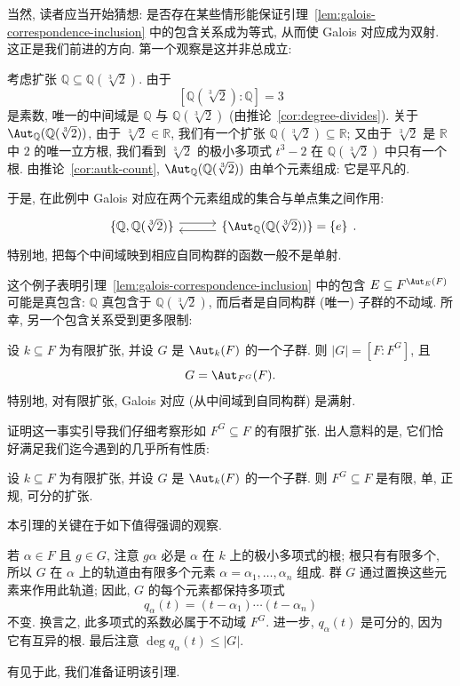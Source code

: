 当然, 读者应当开始猜想: 是否存在某些情形能保证引理~\ref{lem:galois-correspondence-inclusion} 中的包含关系成为等式, 从而使 Galois 对应成为双射. 这正是我们前进的方向. 第一个观察是这并非总成立:

\begin{example}\label{ex:cube-root-2-not-galois}
考虑扩张 $\mathbb{Q}\subseteq\mathbb{Q}(\sqrt[3]{2})$. 由于
\[
[\mathbb{Q}(\sqrt[3]{2}):\mathbb{Q}]=3
\]
是素数, 唯一的中间域是 $\mathbb{Q}$ 与 $\mathbb{Q}(\sqrt[3]{2})$ (由推论~\ref{cor:degree-divides}). 关于 $\Aut_{\mathbb{Q}}(\mathbb{Q}(\sqrt[3]{2}))$, 由于 $\sqrt[3]{2}\in\mathbb{R}$, 我们有一个扩张 $\mathbb{Q}(\sqrt[3]{2})\subseteq\mathbb{R}$; 又由于 $\sqrt[3]{2}$ 是 $\mathbb{R}$ 中 $2$ 的唯一立方根, 我们看到 $\sqrt[3]{2}$ 的极小多项式 $t^3-2$ 在 $\mathbb{Q}(\sqrt[3]{2})$ 中只有一个根. 由推论~\ref{cor:autk-count}, $\Aut_{\mathbb{Q}}(\mathbb{Q}(\sqrt[3]{2}))$ 由单个元素组成: 它是平凡的.

于是, 在此例中 Galois 对应在两个元素组成的集合与单点集之间作用:
\[
\begin{tikzcd}[column sep=3em]
\{\mathbb{Q},\mathbb{Q}(\sqrt[3]{2})\} \ar[r,shift left=.7ex] & \{\Aut_{\mathbb{Q}}(\mathbb{Q}(\sqrt[3]{2}))\}=\{e\} \ar[l,shift left=.7ex]
\end{tikzcd}.
\]
特别地, 把每个中间域映到相应自同构群的函数一般不是单射.

这个例子表明引理~\ref{lem:galois-correspondence-inclusion} 中的包含 $E\subseteq F^{\Aut_E(F)}$ 可能是真包含: $\mathbb{Q}$ 真包含于 $\mathbb{Q}(\sqrt[3]{2})$, 而后者是自同构群 (唯一) 子群的不动域. 所幸, 另一个包含关系受到更多限制:
\end{example}

\begin{proposition}\label{prop:aut-fixed-field-degree}
设 $k\subseteq F$ 为有限扩张, 并设 $G$ 是 $\Aut_k(F)$ 的一个子群. 则 $|G|=[F:F^G]$, 且
\[
G=\Aut_{F^G}(F).
\]
特别地, 对有限扩张, Galois 对应 (从中间域到自同构群) 是满射.
\end{proposition}

证明这一事实引导我们仔细考察形如 $F^G\subseteq F$ 的有限扩张. 出人意料的是, 它们恰好满足我们迄今遇到的几乎所有性质:

\begin{lemma}\label{lem:fixed-field-ext-props}
设 $k\subseteq F$ 为有限扩张, 并设 $G$ 是 $\Aut_k(F)$ 的一个子群. 则 $F^G\subseteq F$ 是有限, 单, 正规, 可分的扩张.
\end{lemma}

\begin{remark}\label{rmk:galois-orbit-poly}
本引理的关键在于如下值得强调的观察.

若 $\alpha\in F$ 且 $g\in G$, 注意 $g\alpha$ 必是 $\alpha$ 在 $k$ 上的极小多项式的根; 根只有有限多个, 所以 $G$ 在 $\alpha$ 上的轨道由有限多个元素 $\alpha=\alpha_{1},\ldots,\alpha_{n}$ 组成. 群 $G$ 通过置换这些元素来作用此轨道; 因此, $G$ 的每个元素都保持多项式
\[
q_\alpha(t)=(t-\alpha_{1})\cdots(t-\alpha_{n})
\]
不变. 换言之, 此多项式的系数必属于不动域 $F^G$. 进一步, $q_\alpha(t)$ 是可分的, 因为它有互异的根. 最后注意 $\deg q_\alpha(t)\leq |G|$.

有见于此, 我们准备证明该引理.
\end{remark}

